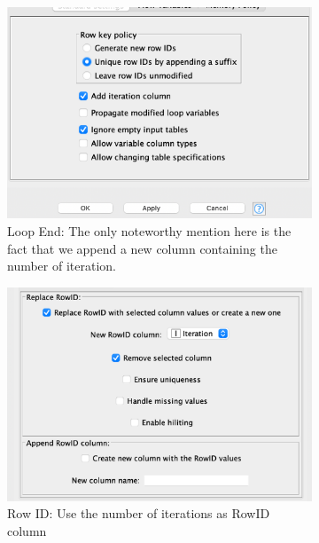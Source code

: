 \documentclass[11pt]{article}
\begin{document}
\begin{figure}[H]
\begin{subfigure}{0.35\textwidth}
					\includegraphics[width=\textwidth]{res/t1/t15/t15-loop-end-conf}
					\caption{Loop End: The only noteworthy mention here is the fact that we append a new column containing the number of iteration.}
					\label{fig:third}
				\end{subfigure}	
				\begin{subfigure}{0.4\textwidth}
					\includegraphics[width=\textwidth]{res/t1/t15/t15-row-id-conf}
					\caption{Row ID: Use the number of iterations as RowID column}
					\label{fig:first}
				\end{subfigure}
				\hfill
				\begin{subfigure}{0.35\textwidth}

\end{subfigure}
\end{figure}
\end{document}
